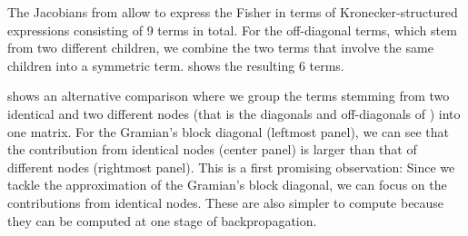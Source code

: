 

The Jacobians from  allow to express the Fisher in terms of Kronecker-structured expressions consisting of 9 terms in total.
For the off-diagonal terms, which stem from two different children, we combine the two terms that involve the same children into a symmetric term.
 shows the resulting 6 terms.



 shows an alternative comparison where we group the terms stemming from two identical and two different nodes (that is the diagonals and off-diagonals of ) into one matrix.
For the Gramian's block diagonal (leftmost panel), we can see that the contribution from identical nodes (center panel) is larger than that of different nodes (rightmost panel).
This is a first promising observation: Since we tackle the approximation of the Gramian's block diagonal, we can focus on the contributions from identical nodes.
These are also simpler to compute because they can be computed at one stage of backpropagation.

